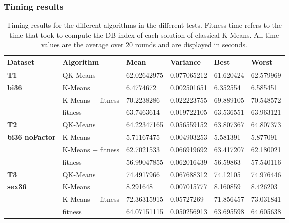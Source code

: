 \subsubsection{Timing results}


\begin{table}[h]
\caption{Timing results for the different algorithms in the different tests. Fitness time refers to the time that took to compute the DB index of each solution of classical K-Means. All time values are the average over 20 rounds and are displayed in seconds.}
\begin{tabular}{|l|l|l|l|l|l|}
\hline
\textbf{Dataset}               & \textbf{Algorithm} & \textbf{Mean} & \textbf{Variance} & \textbf{Best} & \textbf{Worst} \\ \hline
\textbf{T1}                    & QK-Means           & 62.02642975   & 0.077065212       & 61.620424     & 62.579969      \\ \cline{2-6} 
\textbf{bi36}                  & K-Means            & 6.4774672     & 0.002501651       & 6.352554      & 6.585451       \\ \cline{2-6} 
\textbf{}                      & K-Means + fitness  & 70.2238286    & 0.022223755       & 69.889105     & 70.548572      \\ \cline{2-6} 
\textbf{}                      & fitness            & 63.7463614    & 0.019722105       & 63.536551     & 63.963121      \\ \hline
\textbf{T2}                    & QK-Means           & 64.22347165   & 0.056559152       & 63.807367     & 64.807373      \\ \cline{2-6} 
\textbf{bi36 noFactor} & K-Means            & 5.71167475    & 0.004903253       & 5.581391      & 5.877091       \\ \cline{2-6} 
\textbf{}                      & K-Means + fitness  & 62.7021533    & 0.066919692       & 63.417207     & 62.180021      \\ \cline{2-6} 
\textbf{}                      & fitness            & 56.99047855   & 0.062016439       & 56.59863      & 57.540116      \\ \hline
\textbf{T3}                    & QK-Means           & 74.4917966    & 0.067688312       & 74.12105      & 74.976446      \\ \cline{2-6} 
\textbf{sex36}                 & K-Means            & 8.291648      & 0.007015777       & 8.160859      & 8.426203       \\ \cline{2-6} 
                               & K-Means + fitness  & 72.36315915   & 0.05727269        & 71.856457     & 73.031841      \\ \cline{2-6} 
                               & fitness            & 64.07151115   & 0.050256913       & 63.695598     & 64.605638      \\ \hline
\end{tabular}
\end{table}

